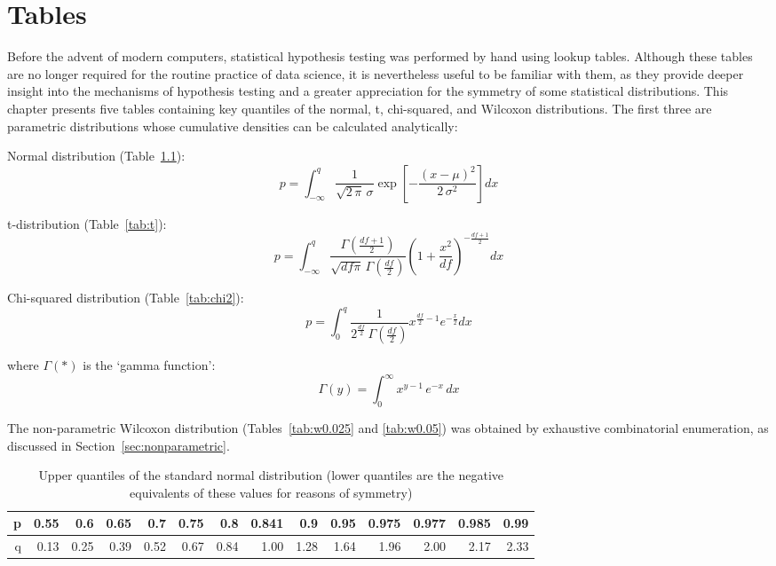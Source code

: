 \chapter{Tables}
\label{ch:tables}

Before the advent of modern computers, statistical hypothesis testing
was performed by hand using lookup tables. Although these tables are
no longer required for the routine practice of data science, it is
nevertheless useful to be familiar with them, as they provide deeper
insight into the mechanisms of hypothesis testing and a greater
appreciation for the symmetry of some statistical distributions. This
chapter presents five tables containing key quantiles of the normal,
t, chi-squared, and Wilcoxon distributions. The first three are
parametric distributions whose cumulative densities can be calculated
analytically:
\begin{description}
\item Normal distribution (Table~\ref{tab:normal}):
  \begin{equation}
    p = \int_{-\infty}^{q} \dfrac{1}{\sqrt{2\,\pi}\,\sigma}
      \exp\left[-\dfrac{(x-\mu)^2}{2\,\sigma^2}\right] dx
  \end{equation}
\item t-distribution (Table~\ref{tab:t}):
  \begin{equation}
    p = \int_{-\infty}^{q} 
    \dfrac{\Gamma\!\left(\frac{df+1}{2}\right)}
          {\sqrt{df\pi}\,\Gamma\!\left(\frac{df}{2}\right)}
          \left(1 + \frac{x^2}{df}\right)^{-\frac{df+1}{2}} dx
  \end{equation}
\item Chi-squared distribution (Table~\ref{tab:chi2}):
  \begin{equation}
    p = \int_0^{q} 
    \frac{1}{2^{\frac{df}{2}}\,\Gamma\!\left(\frac{df}{2}\right)}
    x^{\frac{df}{2}-1} e^{-\frac{x}{2}} dx
  \end{equation}
\end{description}

\noindent where $\Gamma(\ast)$ is the `gamma function':
  \begin{equation}
    \Gamma(y) = \int_0^{\infty} x^{y-1}\,e^{-x}\,dx
  \end{equation}

The non-parametric Wilcoxon distribution (Tables~\ref{tab:w0.025} and
\ref{tab:w0.05}) was obtained by exhaustive combinatorial enumeration,
as discussed in Section~\ref{sec:nonparametric}.

\begin{table}[ht]
\centering
\begin{tabular}{rrrrrrrrrrrrrr}
  \hline
 p & 0.55 & 0.6 & 0.65 & 0.7 & 0.75 & 0.8 & 0.841 & 0.9 & 0.95 & 0.975 & 0.977 & 0.985 & 0.99 \\ 
  \hline
 q & 0.13 & 0.25 & 0.39 & 0.52 & 0.67 & 0.84 & 1.00 & 1.28 & 1.64 & 1.96 & 2.00 & 2.17 & 2.33 \\ 
   \hline
\end{tabular}
\caption{Upper quantiles of the standard normal distribution (lower quantiles are the negative equivalents of these values for reasons of symmetry)}
\label{tab:normal}
\end{table}

